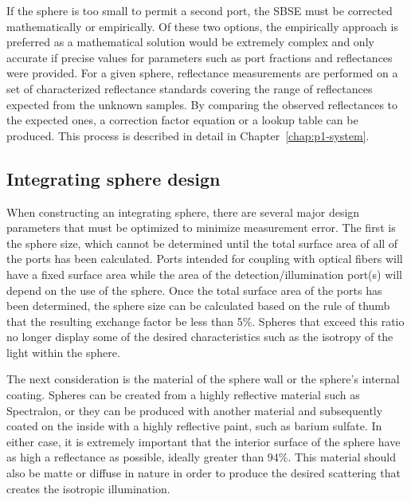 If the sphere is too small to permit a second port, the SBSE must be corrected mathematically or empirically. Of these two options, the empirically approach is preferred as a mathematical solution would be extremely complex and only accurate if precise values for parameters such as port fractions and reflectances were provided. For a given sphere, reflectance measurements are performed on a set of characterized reflectance standards covering the range of reflectances expected from the unknown samples. By comparing the observed reflectances to the expected ones, a correction factor equation or a lookup table can be produced. This process is described in detail in Chapter~\ref{chap:p1-system}.

\subsection{Integrating sphere design}
When constructing an integrating sphere, there are several major design parameters that must be optimized to minimize measurement error. The first is the sphere size, which cannot be determined until the total surface area of all of the ports has been calculated. Ports intended for coupling with optical fibers will have a fixed surface area while the area of the detection/illumination port(s) will depend on the use of the sphere. Once the total surface area of the ports has been determined, the sphere size can be calculated based on the rule of thumb that the resulting exchange factor be less than 5\%.\cite{Labsphereb} Spheres that exceed this ratio no longer display some of the desired characteristics such as the isotropy of the light within the sphere.

The next consideration is the material of the sphere wall or the sphere's internal coating. Spheres can be created from a highly reflective material such as Spectralon\textregistered, or they can be produced with another material and subsequently coated on the inside with a highly reflective paint, such as barium sulfate. In either case, it is extremely important that the interior surface of the sphere have as high a reflectance as possible, ideally greater than 94\%. This material should also be matte or diffuse in nature in order to produce the desired scattering that creates the isotropic illumination.

